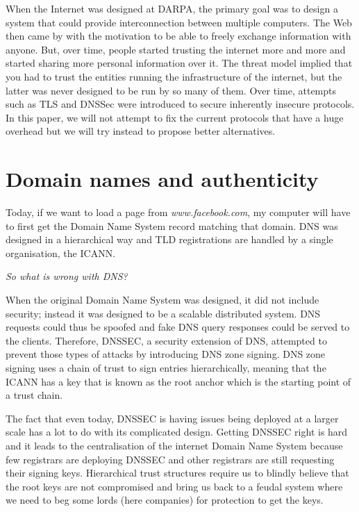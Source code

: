 \documentclass{vldb}
\begin{document}
When the Internet was designed at DARPA, the primary goal was to design a system that could provide interconnection between multiple computers. The Web then came by with the motivation to be able to freely exchange information with anyone. But, over time, people started trusting the internet more and more and started sharing more personal information over it. The threat model implied that you had to trust the entities running the infrastructure of the internet, but the latter was never designed to be run by so many of them. Over time, attempts such as TLS and DNSSec were introduced to secure inherently insecure protocols. In this paper, we will not attempt to fix the current protocols that have a huge overhead but we will try instead to propose better alternatives.

\section{Domain names and authenticity}

Today, if we want to load a page from \emph{www.facebook.com}, my computer will have to first get the Domain Name System record matching that domain. DNS was designed in a hierarchical way and TLD registrations are handled by a single organisation, the ICANN.

\emph{So what is wrong with DNS?}

When the original Domain Name System was designed, it did not include security; instead it was designed to be a scalable distributed system. DNS requests could thus be spoofed and fake DNS query responses could be served to the clients. Therefore, DNSSEC, a security extension of DNS, attempted to prevent those types of attacks by introducing DNS zone signing. DNS zone signing uses a chain of trust to sign entries hierarchically,  meaning that the ICANN has a key that is known as the root anchor which is the starting point of a trust chain.

The fact that even today, DNSSEC is having issues being deployed at a larger scale has a lot to do with its complicated design. Getting DNSSEC right is hard and it leads to the centralisation of the internet Domain Name System because few registrars are deploying DNSSEC and other registrars are still requesting their signing keys. Hierarchical trust structures require us to blindly believe that the root keys are not compromised and bring us back to a feudal system where we need to beg some lords (here companies) for protection to get the keys.
\end{document}
